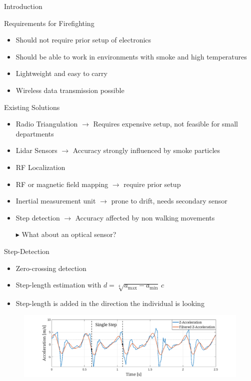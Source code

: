 \documentclass[aspectratio=1609]{beamer}
\begin{document}
{\begin{frame}{Introduction}
		
	\end{frame}
	
	\begin{frame}{Requirements for Firefighting}
		\begin{itemize}
			\item Should not require prior setup of electronics
			\item Should be able to work in environments with smoke and high temperatures
			\item Lightweight and easy to carry
			\item Wireless data transmission possible
		\end{itemize}
	\end{frame}
	
	\begin{frame}{Existing Solutions}
		\begin{itemize}
			\item Radio Triangulation $\rightarrow$ Requires expensive setup, not feasible for small departments 
			\item Lidar Sensors $\rightarrow$ Accuracy strongly influenced by smoke particles
			\item RF Localization 
			\item RF or magnetic field mapping $\rightarrow$ require prior setup
			\item Inertial measurement unit $\rightarrow$ prone to drift, needs secondary sensor
			\item Step detection $\rightarrow$ Accuracy affected by non walking movements
			\item[$\blacktriangleright$] What about an optical sensor?
		\end{itemize}
	\end{frame}
	
	\begin{frame}{Step-Detection}
		\begin{itemize}
			\item Zero-crossing detection 
			\item Step-length estimation with $d = \sqrt[4]{a_{\max}-a_{\min}}  \, c$
			\item Step-length is added in the direction the individual is looking
		\end{itemize}
		\vspace{0.5cm}
		\begin{figure}
			\centering
			\includegraphics[width=0.9\linewidth]{../Conference_Paper/WalkAcceleration}
			\caption{}
			\label{fig:walkacceleration}
		\end{figure}
			


\end{frame}}
\end{document}
